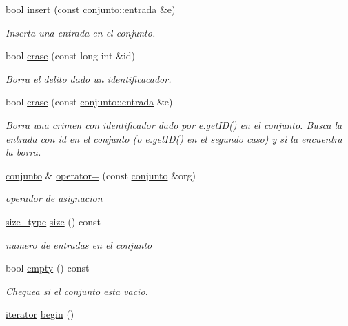 \begin{DoxyCompactItemize}
bool \hyperlink{classconjunto_aa65b9f7c4cb9bad6d4e40c1973095930}{insert} (const \hyperlink{classconjunto_a09cad766dd65de73e51eae21f9d22585}{conjunto\-::entrada} \&e)
\begin{DoxyCompactList}\small\item\em Inserta una entrada en el conjunto. \end{DoxyCompactList}\item 
bool \hyperlink{classconjunto_ad550177fa4454da3a10fa356417e39a7}{erase} (const long int \&id)
\begin{DoxyCompactList}\small\item\em Borra el delito dado un identificacador. \end{DoxyCompactList}\item 
bool \hyperlink{classconjunto_a77a21ed91f1002f4eaed48d86535a874}{erase} (const \hyperlink{classconjunto_a09cad766dd65de73e51eae21f9d22585}{conjunto\-::entrada} \&e)
\begin{DoxyCompactList}\small\item\em Borra una crimen con identificador dado por e.\-get\-I\-D() en el conjunto. Busca la entrada con id en el conjunto (o e.\-get\-I\-D() en el segundo caso) y si la encuentra la borra. \end{DoxyCompactList}\item 
\hyperlink{classconjunto}{conjunto} \& \hyperlink{classconjunto_a2bdce402a4b76117b68fe71c0dffab87}{operator=} (const \hyperlink{classconjunto}{conjunto} \&org)
\begin{DoxyCompactList}\small\item\em operador de asignacion \end{DoxyCompactList}\item 
\hyperlink{classconjunto_a855a5893bb0f5a851ab2dbf2b8aa6cc7}{size\-\_\-type} \hyperlink{classconjunto_a863e1e106e35adda47e7c5e2067295b9}{size} () const 
\begin{DoxyCompactList}\small\item\em numero de entradas en el conjunto \end{DoxyCompactList}\item 
bool \hyperlink{classconjunto_afcf4ff3ff3c1f83b63e901efebe93533}{empty} () const 
\begin{DoxyCompactList}\small\item\em Chequea si el conjunto esta vacio. \end{DoxyCompactList}\item 
\hyperlink{classconjunto_1_1iterator}{iterator} \hyperlink{classconjunto_afa23571eda40d3653b9dcd89f1042ebc}{begin} ()

\end{DoxyCompactItemize}

